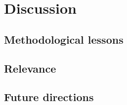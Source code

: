 \chapter{Discussion\label{chap:Discussion}}


\section{Methodological lessons}

\section{Relevance}

\section{Future directions}
% 

